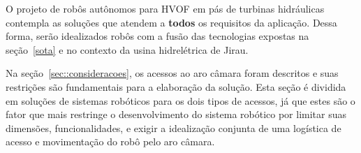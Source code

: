 O projeto de robôs autônomos para HVOF em pás de turbinas hidráulicas contempla
as soluções que atendem a \textbf{todos} os requisitos da aplicação. Dessa
forma, serão idealizados robôs com a fusão das tecnologias expostas na
seção~\ref{sota} e no contexto da usina hidrelétrica de Jirau. 

Na seção~\ref{sec::consideracoes}, os acessos ao aro câmara foram
descritos e suas restrições são fundamentais para a elaboração da solução.
Esta seção é dividida em soluções de sistemas robóticos para os dois tipos
de acessos, já que estes são o fator que mais restringe o desenvolvimento do
sistema robótico por limitar suas dimensões, funcionalidades, e exigir a
idealização conjunta de uma logística de acesso e movimentação do robô pelo aro
câmara.
